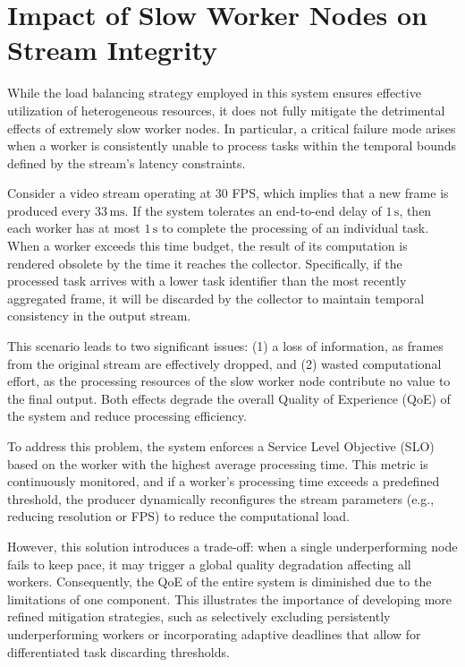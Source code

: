\section{Impact of Slow Worker Nodes on Stream Integrity}

While the load balancing strategy employed in this system ensures effective utilization of heterogeneous resources, it does not fully mitigate the detrimental effects of extremely slow worker nodes. In particular, a critical failure mode arises when a worker is consistently unable to process tasks within the temporal bounds defined by the stream's latency constraints.

Consider a video stream operating at 30 FPS, which implies that a new frame is produced every \(33\,\text{ms}\). If the system tolerates an end-to-end delay of \(1\,\text{s}\), then each worker has at most \(1\,\text{s}\) to complete the processing of an individual task. When a worker exceeds this time budget, the result of its computation is rendered obsolete by the time it reaches the collector. Specifically, if the processed task arrives with a lower task identifier than the most recently aggregated frame, it will be discarded by the collector to maintain temporal consistency in the output stream.

This scenario leads to two significant issues: (1) a loss of information, as frames from the original stream are effectively dropped, and (2) wasted computational effort, as the processing resources of the slow worker node contribute no value to the final output. Both effects degrade the overall Quality of Experience (QoE) of the system and reduce processing efficiency.

To address this problem, the system enforces a Service Level Objective (SLO) based on the worker with the highest average processing time. This metric is continuously monitored, and if a worker's processing time exceeds a predefined threshold, the producer dynamically reconfigures the stream parameters (e.g., reducing resolution or FPS) to reduce the computational load. 

However, this solution introduces a trade-off: when a single underperforming node fails to keep pace, it may trigger a global quality degradation affecting all workers. Consequently, the QoE of the entire system is diminished due to the limitations of one component. This illustrates the importance of developing more refined mitigation strategies, such as selectively excluding persistently underperforming workers or incorporating adaptive deadlines that allow for differentiated task discarding thresholds.
